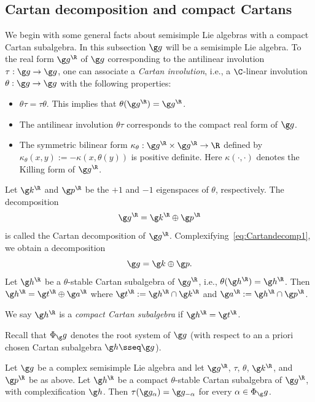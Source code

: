 \documentclass[12pt]{amsart}
\begin{document}
\subsection{Cartan decomposition and compact Cartans}
We begin with some general facts about semisimple Lie algebras with a compact Cartan subalgebra. 
In this subsection $\g g$ will be a semisimple Lie algebra. 
To the  real form $\g g^\R$ of $\g g$ corresponding to the antilinear involution $\tau:\g g\to \g g$, one can associate a \emph{Cartan involution}, i.e., a $\C$-linear involution $\theta:\g g\to\g g$  with the following properties:
\begin{itemize}
\item[(i)] $\theta\tau=\tau\theta$. This implies that $\theta(\g g^\R)=\g g^\R$.
\item[(ii)] The antilinear involution $\theta\tau$ corresponds to the  compact real form of $\g g$. 
\item[(iii)] The symmetric bilinear form  
$\kappa_\theta:\g g^\R\times \g g^\R\to\R$ defined by $\kappa_\theta(x,y):=-\kappa(x,\theta(y))$ is positive definite. Here $\kappa(\cdot,\cdot)$ denotes the Killing form of $\g g^\R$.
\end{itemize}
Let 
$\g k^\R$ and $\g p^\R$ be the $+1$ and $-1$ eigenspaces of $\theta$, respectively. 
The decomposition 
\begin{equation}
\label{eq:Cartandecomp1}
\g g^\R=\g k^\R\oplus\g p^\R 
\end{equation}
is called the Cartan decomposition of $\g g^\R$. Complexifying~\eqref{eq:Cartandecomp1}, we obtain a decomposition
\[
\g g=\g k\oplus \g p.
\]
Let $\g h^\R$ be a $\theta$-stable  Cartan subalgebra of $\g g^\R$, i.e.,  $\theta(\g h^\R)=\g h^\R$. Then  $\g h^\R=\g t^\R\oplus \g a^\R$ where $\g t^\R:=\g h^\R\cap\g k^\R$ and $\g a^\R:=\g h^\R\cap \g p^\R$. 
\begin{dfn}
We say $\g h^\R$ is a \emph{compact Cartan subalgebra} if $\g h^\R=\g t^\R$.  
\end{dfn}
Recall that  $\Phi_\g g$ denotes the root system of $\g g$ (with respect to an a priori  chosen  Cartan subalgebra $\g h\sseq \g g$). 
\begin{lem}
\label{lem:kcompalpha-alpha}
  Let $\g g$ be a complex semisimple Lie algebra and let $\g g^\R$, $\tau$, $\theta$, $\g k^\R$, and $\g p^\R$  be as above.  Let $\g h^\R$ be a compact $\theta$-stable Cartan subalgebra of $\g g^\R$, with complexification $\g h$. Then  
$\tau(\g g_\alpha)=\g g_{-\alpha}$
 for every  $\alpha\in\Phi_\g g$.
 \end{lem}
\end{document}
